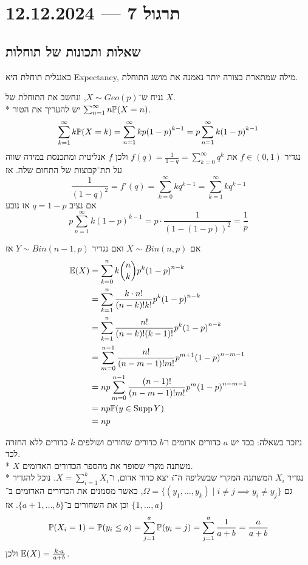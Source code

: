 \section{תרגול 7 --- 12.12.2024}
\subsection{שאלות ותכונות של תוחלות}
באנגלית תוחלת היא Expectancy, מילה שמתארת בצורה יותר נאמנה את מושג התוחלת.
\begin{example}
	נניח ש־$X \sim Geo(p)$, ונחשב את התוחלת של $X$. \\*
	יש להעריך את הטור $\sum_{n = 1}^\infty n \mathbb{P}(X = n)$.
	\[
		\sum_{k = 1}^\infty k \mathbb{P}(X = k)
		= \sum_{n = 1}^\infty k p {(1 - p)}^{k - 1}
		= p \sum_{n = 1}^\infty k {(1 - p)}^{k - 1}
	\]
	נגדיר $f \in (0, 1)$ את $f(q) = \frac{1}{1 - q} = \sum_{k = 0}^{\infty} q^k$ ולכן $f$ אנליטית ומתכנסת במידה שווה על תת־קבוצות של התחום שלה.
	אז
	\[
		\frac{1}{{(1 - q)}^2}
		= f'(q)
		= \sum_{k = 0}^{\infty} k q^{k - 1}
		= \sum_{k = 1}^{\infty} k q^{k - 1}
	\]
	אם נציב $q = 1 - p$ אז נובע
	\[
		p \sum_{n = 1}^\infty k {(1 - p)}^{k - 1}
		= p \cdot \frac{1}{{(1 - (1 - p))}^2}
		= \frac{1}{p}
	\]
\end{example}
\begin{example}
	אם $X \sim Bin(n, p)$ ואם נגדיר $Y \sim Bin(n - 1, p)$ אז
	\begin{align*}
		\mathbb{E}(X)
		& = \sum_{k = 0}^{n} k \binom{n}{k} p^k {(1 - p)}^{n - k} \\
		& = \sum_{k = 1}^{n} \frac{k \cdot n!}{(n - k)! k!} p^k {(1 - p)}^{n - k} \\
		& = \sum_{k = 1}^{n} \frac{n!}{(n - k)! (k - 1)!} p^k {(1 - p)}^{n - k} \\
		& = \sum_{m = 0}^{n - 1} \frac{n!}{(n - m - 1)! m!} p^{m + 1} {(1 - p)}^{n - m - 1} \\
		& = n p \sum_{m = 0}^{n - 1} \frac{(n - 1)!}{(n - m - 1)! m!} p^m {(1 - p)}^{n - m - 1} \\
		& = n p \mathbb{P}(y \in \operatorname{Supp} Y) \\
		& = n p
	\end{align*}
\end{example}
\begin{example}
	ניזכר בשאלה: בכד יש $a$ כדורים אדומים ו־$b$ כדורים שחורים ושולפים $k$ כדורים ללא החזרה לכד. \\*
	$X$ משתנה מקרי שסופר את מהספר הכדורים האדומים. \\*
	נגדיר $X_i$ המשתנה המקרי שבשליפה ה־$i$ יצא כדור אדום, ו־$X = \sum_{i = 1}^k X_i$.
	נוכל להגדיר גם $\Omega = \{ (y_1, \dots, y_k) \mid i \ne j \implies y_i \ne y_j \}$, כאשר מסמנים את הכדורים האדומים ב־$\{1, \dots, a\}$ וכן את השחורים ב־$\{a + 1, \dots, b\}$.
	אז
	\[
		\mathbb{P}(X_i = 1)
		= \mathbb{P}(y_i \le a)
		= \sum_{j = 1}^{a} \mathbb{P}(y_i = j)
		= \sum_{j = 1}^{a} \frac{1}{a + b}
		= \frac{a}{a + b}
	\]
	ולכן $\mathbb{E}(X) = \frac{k \cdot a}{a + b}$.
\end{example}

